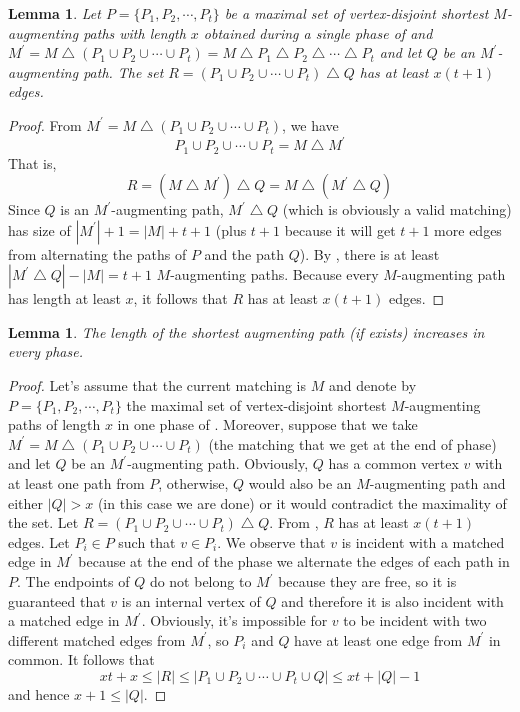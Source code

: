 \documentclass[12pt]{report}
\newtheorem{llemma}[base]{Lemma}
\numberwithin{algorithm}{chapter}
\begin{document}
	\begin{llemma} \label{setRfromHKAlg}
		Let $P = \{P_{1}, P_{2}, \cdots, P_{t}\}$ be a maximal set of vertex-disjoint shortest $M$-augmenting paths with length $x$ obtained during a single phase of  and $M^{'} = M \bigtriangleup (P_{1} \cup P_{2} \cup \cdots \cup P_{t}) = M \bigtriangleup P_{1} \bigtriangleup P_{2} \bigtriangleup \cdots \bigtriangleup P_{t}$ and let $Q$ be an $M^{'}$-augmenting path. The set $R = (P_{1} \cup P_{2} \cup \cdots \cup P_{t}) \bigtriangleup Q$ has at least $x(t + 1)$ edges.
	\end{llemma}
	\begin{proof}
		From $M^{'} = M \bigtriangleup (P_{1} \cup P_{2} \cup \cdots \cup P_{t})$, we have
		\[
			P_{1} \cup P_{2} \cup \cdots \cup P_{t} = M \bigtriangleup M^{'}
		\]
		That is,
		\[
			R= (M \bigtriangleup M^{'}) \bigtriangleup Q = M \bigtriangleup (M^{'} \bigtriangleup Q)
		\]
		Since $Q$ is an $M^{'}$-augmenting path, $M^{'} \bigtriangleup Q$ (which is obviously a valid matching) has size of $|M^{'}| + 1 = |M| + t + 1$ (plus $t + 1$ because it will get $t + 1$ more edges from alternating the paths of $P$ and the path $Q$). By , there is at least $|M^{'} \bigtriangleup Q| - |M| = t + 1$ $M$-augmenting paths. Because every $M$-augmenting path has length at least $x$, it follows that $R$ has at least $x(t + 1)$ edges.
	\end{proof}

	\begin{llemma} \label{lengthAugmInHK}
		The length of the shortest augmenting path (if exists) increases in every phase.
	\end{llemma}
	\begin{proof}
		Let’s assume that the current matching is $M$ and denote by $P = \{P_{1}, P_{2}, \cdots, P_{t}\}$ the maximal set of vertex-disjoint shortest $M$-augmenting paths  of length $x$ in one phase of . Moreover, suppose that we take $M^{'} = M \bigtriangleup (P_{1} \cup P_{2} \cup \cdots \cup P_{t})$ (the matching that we get at the end of phase) and let $Q$ be an $M^{'}$-augmenting path. Obviously, $Q$ has a common vertex $v$ with at least one path from $P$, otherwise, $Q$ would also be an $M$-augmenting path and either $|Q| > x$ (in this case we are done) or it would contradict the maximality of the set. Let $R = (P_{1} \cup P_{2} \cup \cdots \cup P_{t}) \bigtriangleup Q$. From , $R$ has at least $x(t+1)$ edges. Let $P_{i} \in P$ such that $v \in P_{i}$. We observe that $v$ is incident with a matched edge in $M^{'}$ because at the end of the phase we alternate the edges of each path in $P$. The endpoints of $Q$ do not belong to $M^{'}$ because they are free, so it is guaranteed that $v$ is an internal vertex of $Q$ and therefore it is also incident with a matched edge in $M^{'}$. Obviously, it's impossible for $v$ to be incident with two different matched edges from $M^{'}$, so $P_{i}$ and $Q$ have at least one edge from $M^{'}$ in common. It follows that
		\[
			xt + x \leq |R| \leq |P_{1} \cup P_{2} \cup \cdots \cup P_{t} \cup Q| \leq xt + |Q| - 1
		\]
		and hence $x + 1 \leq |Q|$.
	\end{proof}
	
\end{document}
